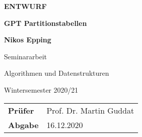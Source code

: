 \begin{titlepage}
    \begin{center}
        \vspace*{1cm}

        \small {\textbf{ENTWURF}}
            
        \Huge
        \textbf{GPT Partitionstabellen}
            
        \vspace{1cm}
            
        \Large
        \textbf{Nikos Epping}
            
   		\vspace{0.8cm}
            
        Seminararbeit
        
        \large 
        Algorithmen und Datenstrukturen

        Wintersemester 2020/21

        \vspace{2cm}

        \begin{center}
        \begin{tabular}{ p{2.5cm} l }
            \textbf{Prüfer} & Prof. Dr. Martin Guddat \\
            \textbf{Abgabe} & 16.12.2020
            \end{tabular}
        \end{center}

        \vfill
            
        
            
    \end{center}
\end{titlepage}
